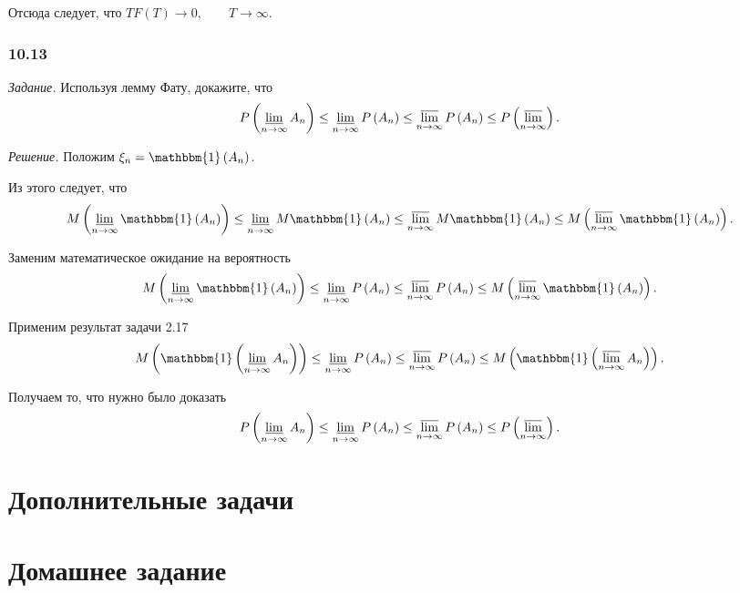 Отсюда следует, что $TF \left( T \right) \rightarrow 0, \qquad T \rightarrow \infty $.

\subsubsection*{10.13}

\textit{Задание.} Используя лемму Фату, докажите, что
$$P \left( \varliminf \limits_{n \to \infty } A_n \right) \leq
\varliminf \limits_{n \to \infty } P \left( A_n \right) \leq
\varlimsup \limits_{n \to \infty } P \left( A_n \right) \leq
P \left( \varlimsup \limits_{n \to \infty } \right).$$

\textit{Решение.} Положим $ \xi_n = \mathbbm{1} \left( A_n \right) $.

Из этого следует, что
$$M \left( \varliminf \limits_{n \to \infty } \mathbbm{1} \left( A_n \right) \right) \leq
\varliminf \limits_{n \to \infty } M \mathbbm{1} \left( A_n \right) \leq
\varlimsup \limits_{n \to \infty } M \mathbbm{1} \left( A_n \right) \leq
M \left( \varlimsup \limits_{n \to \infty } \mathbbm{1} \left( A_n \right) \right).$$

Заменим математическое ожидание на вероятность
$$M \left( \varliminf \limits_{n \to \infty } \mathbbm{1} \left( A_n \right) \right) \leq
\varliminf \limits_{n \to \infty } P \left( A_n \right) \leq
\varlimsup \limits_{n \to \infty } P \left( A_n \right) \leq
M \left( \varlimsup \limits_{n \to \infty } \mathbbm{1} \left( A_n \right) \right).$$

Применим результат задачи 2.17
$$M \left( \mathbbm{1} \left( \varliminf \limits_{n \to \infty } A_n \right) \right) \leq
\varliminf \limits_{n \to \infty } P \left( A_n \right) \leq
\varlimsup \limits_{n \to \infty } P \left( A_n \right) \leq
M \left( \mathbbm{1} \left( \varlimsup \limits_{n \to \infty } A_n \right) \right).$$

Получаем то, что нужно было доказать
$$P \left( \varliminf \limits_{n \to \infty } A_n \right) \leq
\varliminf \limits_{n \to \infty } P \left( A_n \right) \leq
\varlimsup \limits_{n \to \infty } P \left( A_n \right) \leq
P \left( \varlimsup \limits_{n \to \infty } \right).$$

\section*{Дополнительные задачи}

\section*{Домашнее задание}

